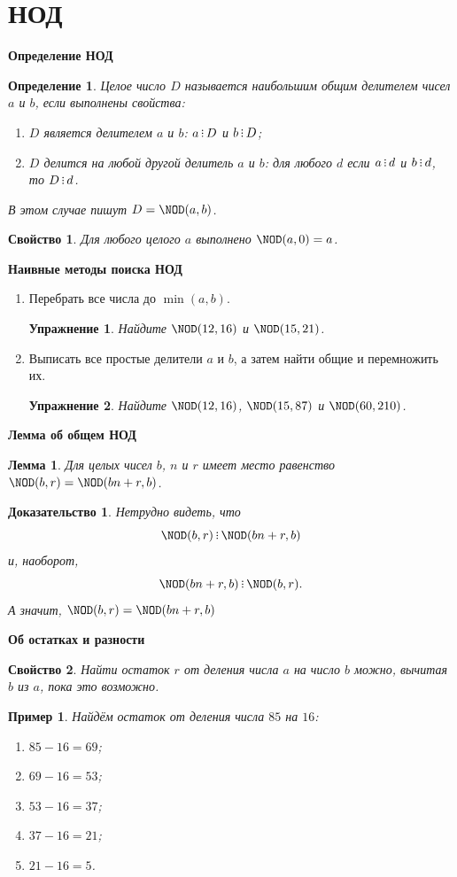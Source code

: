 \documentclass[aspectratio=1610,11pt]{beamer}
\newtheorem{Le}{Лемма}
\newtheorem{Def}{Определение}
\newtheorem{Ex}{Пример}
\newtheorem{Property}{Свойство}
\newtheorem{Prof}{Доказательство}
\newtheorem{Exer}{Упражнение}
\newcommand\fram[2]{\begin{frame}{\bf #1} #2 \end{frame}}
\def\divsby{\mathop{\rlap{.}\rlap{\raisebox{0.55ex}{.}}\raisebox{1.1ex}{.}}}
\begin{document}
\section{НОД}
\fram{Определение НОД}{
\large
\begin{Def}
Целое число $D$ называется наибольшим общим делителем чисел $a$ и $b$, если выполнены свойства:
\begin{enumerate}
\item $D$ является делителем $a$ и $b$: $a \divsby D$ и $b \divsby D$;
\item $D$ делится на любой другой делитель $a$ и $b$: для любого $d$ если $a \divsby d$ и $b \divsby d$, то $D \divsby d$.
\end{enumerate}
В этом случае пишут $D= \NOD(a, b)$.
\end{Def}
\begin{Property}
Для любого целого $a$ выполнено $\NOD(a, 0) = a$.
\end{Property}
}


\fram{Наивные методы поиска НОД}{
\large
\begin{enumerate}
\item Перебрать все числа до $\min(a, b)$.
\begin{Exer}
Найдите $\NOD (12, 16)$ и $\NOD (15, 21)$.
\end{Exer} \pause
\item Выписать все простые делители $a$ и $b$, а затем найти общие и перемножить их.
\begin{Exer}
Найдите $\NOD (12, 16)$, $\NOD (15, 87)$ и $\NOD (60, 210)$.
\end{Exer}
\end{enumerate}
}

\fram{Лемма об общем НОД}{
\large
\begin{Le}
Для целых чисел $b$, $n$ и $r$ имеет место равенство $\NOD(b,r) = \NOD(bn+r, b)$.
\end{Le}

\begin{Prof}
Нетрудно видеть, что \[ \NOD(b,r) \divsby \NOD(bn+r, b)\] \pause и, наоборот, \[\NOD(bn+r, b) \divsby \NOD(b,r).\] \pause А значит, $\NOD(b,r) = \NOD(bn+r, b)$
\end{Prof}
}

\fram{Об остатках и разности}{
\large
\begin{Property}
Найти остаток $r$ от деления числа $a$ на число $b$ можно, вычитая $b$ из $a$, \linebreak пока это возможно.
\end{Property}

\begin{Ex}
Найдём остаток от деления числа $85$ на $16$:
\begin{enumerate}
\item $85 -16 = 69$;
\item $69 -16 = 53$;
\item $53 -16 = 37$;
\item $37 -16 = 21$;
\item $21 -16 = 5$.
\end{enumerate}
\end{Ex}
}
\end{document}
